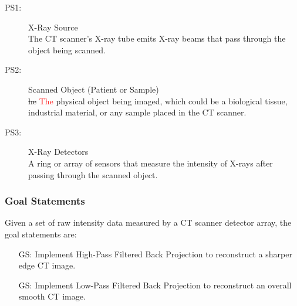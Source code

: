 \documentclass[12pt]{article}
\newcounter{goalnum} %
\newcommand{\add}{\textcolor{red}}
\begin{document}
\begin{description}
\item[PS1:] X-Ray Source \hfill \\
  The CT scanner's X-ray tube emits X-ray beams that pass through the object being scanned.

\item[PS2:] Scanned Object (Patient or Sample) \hfill \\
  \st{he} \add{The} physical object being imaged, which could be a biological tissue, industrial material, or any sample placed in the CT scanner.

\item[PS3:] X-Ray Detectors \hfill \\
  A ring or array of sensors that measure the intensity of X-rays after passing through the scanned object.

%
\end{description}



\subsubsection{Goal Statements}
\noindent Given a set of raw intensity data measured by a CT scanner detector array, the goal statements are:

\begin{itemize}

\item[GS\refstepcounter{goalnum}\thegoalnum \label{G1}:] Implement High-Pass
  Filtered Back Projection to reconstruct a sharper edge CT image.

\item[GS\refstepcounter{goalnum}\thegoalnum \label{G2}:] Implement Low-Pass
  Filtered Back Projection to reconstruct an overall smooth CT image.
\end{itemize}
\end{document}
